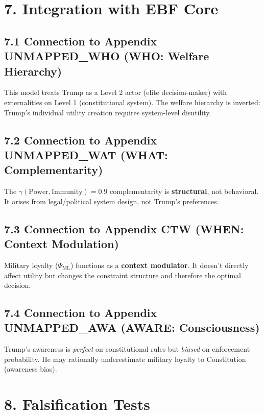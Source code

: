 \section{7. Integration with EBF Core}

\subsection{7.1 Connection to Appendix UNMAPPED_WHO (WHO: Welfare Hierarchy)}

This model treats Trump as a Level 2 actor (elite decision-maker) with externalities on Level 1 (constitutional system). The welfare hierarchy is inverted: Trump's individual utility creation requires system-level disutility.

\subsection{7.2 Connection to Appendix UNMAPPED_WAT (WHAT: Complementarity)}

The $\gamma(\text{Power}, \text{Immunity}) = 0.9$ complementarity is \textbf{structural}, not behavioral. It arises from legal/political system design, not Trump's preferences.

\subsection{7.3 Connection to Appendix CTW (WHEN: Context Modulation)}

Military loyalty ($\Psi_{\text{ML}}$) functions as a \textbf{context modulator}. It doesn't directly affect utility but changes the constraint structure and therefore the optimal decision.

\subsection{7.4 Connection to Appendix UNMAPPED_AWA (AWARE: Consciousness)}

Trump's awareness is \textit{perfect} on constitutional rules but \textit{biased} on enforcement probability. He may rationally underestimate military loyalty to Constitution (awareness bias).

\section{8. Falsification Tests}

